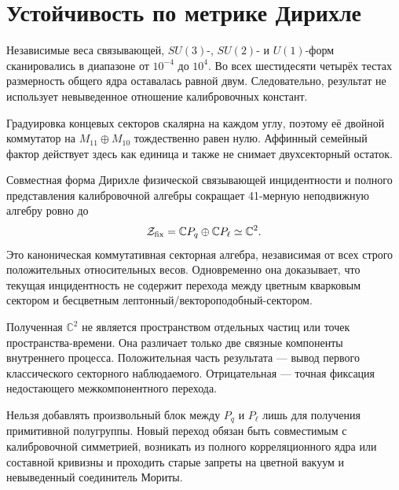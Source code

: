 \section{Устойчивость по метрике Дирихле}

Независимые веса связывающей, $SU(3)$-, $SU(2)$- и $U(1)$-форм сканировались
в диапазоне от $10^{-4}$ до $10^4$. Во всех шестидесяти четырёх тестах
размерность общего ядра оставалась равной двум. Следовательно, результат
не использует невыведенное отношение калибровочных констант.

Градуировка концевых секторов скалярна на каждом углу, поэтому её двойной коммутатор
на $M_{11}\oplus M_{10}$ тождественно равен нулю. Аффинный семейный фактор
действует здесь как единица и также не снимает двухсекторный остаток.

\begin{theorem}
Совместная форма Дирихле физической связывающей инцидентности и полного
представления калибровочной алгебры сокращает 41-мерную неподвижную алгебру
ровно до
\begin{equation}
 \mathcal Z_{\rm fix}=\mathbb CP_q\oplus\mathbb CP_\ell\simeq\mathbb C^2.
\end{equation}
Это каноническая коммутативная секторная алгебра, независимая от всех
строго положительных относительных весов. Одновременно она доказывает, что
текущая инцидентность не содержит перехода между цветным кварковым сектором и
бесцветным лептонный/вектороподобный-сектором.
\end{theorem}

\begin{remark}
Полученная $\mathbb C^2$ не является пространством отдельных частиц или
точек пространства-времени. Она различает только две связные компоненты
внутреннего процесса. Положительная часть результата --- вывод первого
классического секторного наблюдаемого. Отрицательная --- точная фиксация
недостающего межкомпонентного перехода.
\end{remark}

\begin{nogocriterion}
Нельзя добавлять произвольный блок между $P_q$ и $P_\ell$ лишь для получения
примитивной полугруппы. Новый переход обязан быть совместимым с калибровочной симметрией,
возникать из полного корреляционного ядра или составной кривизны и проходить
старые запреты на цветной вакуум и невыведенный соединитель Мориты.
\end{nogocriterion}


